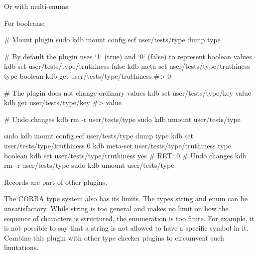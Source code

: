 Or with multi-\/enums\+:




For booleans\+:


\begin{DoxyCode}
# Mount plugin
sudo kdb mount config.ecf user/tests/type dump type

# By default the plugin uses `1` (true) and `0` (false) to represent boolean values
kdb set user/tests/type/truthiness false
kdb meta-set user/tests/type/truthiness type boolean
kdb get user/tests/type/truthiness
#> 0

# The plugin does not change ordinary values
kdb set user/tests/type/key value
kdb get user/tests/type/key
#> value

# Undo changes
kdb rm -r user/tests/type
sudo kdb umount user/tests/type
\end{DoxyCode}



\begin{DoxyCode}
sudo kdb mount config.ecf user/tests/type dump type
kdb set user/tests/type/truthiness 0
kdb meta-set user/tests/type/truthiness type boolean
 kdb set user/tests/type/truthiness yes
# RET: 0
 # Undo changes
kdb rm -r user/tests/type
sudo kdb umount user/tests/type
\end{DoxyCode}


Records are part of other plugins.

The {\ttfamily C\+O\+R\+BA} type system also has its limits. The types {\ttfamily string} and {\ttfamily enum} can be unsatisfactory. While string is too general and makes no limit on how the sequence of characters is structured, the enumeration is too finite. For example, it is not possible to say that a string is not allowed to have a specific symbol in it. Combine this plugin with other type checker plugins to circumvent such limitations. 